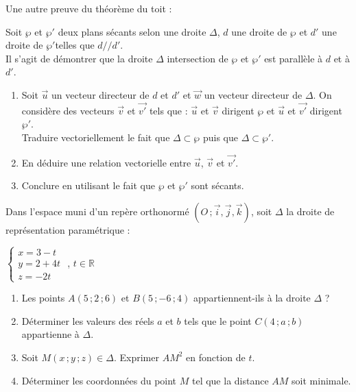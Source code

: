 \documentclass{cornouaille}
\begin{document}
  \begin{exercice}
    Une autre preuve du théorème du toit  :

    \begin{center}
      
    \end{center}

    Soit $\wp$ et $\wp'$ deux plans sécants selon une droite $\Delta$,
    $d$ une droite de $\wp$ et $d'$ une droite de $\wp'$telles que
    $d//d'$.  \\ Il s'agit de démontrer que la droite $\Delta$
    intersection de $\wp$ et $\wp'$ est parallèle à $d$ et à $d'$.
    \begin{enumerate}
    \item Soit $\vec{u}$ un vecteur directeur de $d$ et $d'$ et
      $\vec{w}$ un vecteur directeur de $\Delta$.  On considère des
      vecteurs $\vec{v}$ et $\vec{v'}$ tels que : $\vec{u}$ et
      $\vec{v}$ dirigent $\wp$ et
      $\vec{u}$ et $\vec{v'}$ dirigent $\wp'$.\\
      Traduire vectoriellement le fait que $\Delta\subset\wp$ puis que
      $\Delta\subset\wp'$.
    \item En déduire une relation vectorielle entre $\vec{u}$,
      $\vec{v}$ et $\vec{v'}$.
    \item Conclure en utilisant le fait que $\wp$ et $\wp'$ sont
      sécants.
    \end{enumerate}
  \end{exercice}

  \begin{exercice}
    Dans l'espace muni d'un repère orthonormé
    $(O\,; \vec{i},\vec{j},\vec{k})$, soit $\Delta$ la droite de
    représentation paramétrique :

    \begin{center}
      $\begin{cases}x=3-t \\y=2+4t \\z=-2t \end{cases}$ ,
      $t\in\mathbb{R}$
    \end{center}

    \begin{enumerate}
    \item Les points $A(5\,;2\,;6)$ et $B(5\,;-6\,;4)$
      appartiennent-ils à la droite $\Delta$ ?
    \item Déterminer les valeurs des réels $a$ et $b$ tels que le
      point $C(4\,;a\,;b)$ appartienne à $\Delta$.
    \item Soit $M(x\,;y\,;z)\in \Delta$. Exprimer $AM^2$ en fonction
      de $t$.
    \item Déterminer les coordonnées du point $M$ tel que la distance
      $AM$ soit minimale.
    \end{enumerate}
  \end{exercice}
\end{document}
